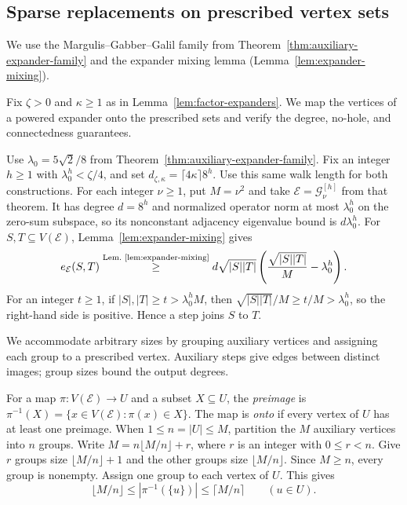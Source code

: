 \subsection{Sparse replacements on prescribed vertex sets}
\label{app:factor-expanders}

We use the Margulis--Gabber--Galil family from
Theorem~\ref{thm:auxiliary-expander-family} and the expander mixing
lemma (Lemma~\ref{lem:expander-mixing}).

Fix $\zeta>0$ and $\kappa\ge1$ as in Lemma~\ref{lem:factor-expanders}.
We map the vertices of a powered expander onto the prescribed sets
and verify the degree, no-hole, and connectedness guarantees.

Use $\lambda_0=5\sqrt2/8$ from
Theorem~\ref{thm:auxiliary-expander-family}. Fix an integer $h\ge1$
with $\lambda_0^h<\zeta/4$, and set
$d_{\zeta,\kappa}=\lceil4\kappa\rceil8^h$.
Use this same walk length for both constructions. For each integer
$\nu\ge1$, put $M=\nu^2$ and take
$\mathcal E=\mathcal G_\nu^{[h]}$ from that theorem.
It has degree $d=8^h$ and normalized operator norm at most
$\lambda_0^h$ on the zero-sum subspace, so its nonconstant
adjacency eigenvalue bound is $d\lambda_0^h$.
For $S,T\subseteq V(\mathcal E)$, Lemma~\ref{lem:expander-mixing} gives
\begin{equation}\label{eq:factor-expander-mixing}
 e_{\mathcal E}(S,T)
 \overset{\text{Lem.~\ref{lem:expander-mixing}}}{\geq}
 d\sqrt{|S||T|}\left(\frac{\sqrt{|S||T|}}{M}-\lambda_0^h\right).
\end{equation}
For an integer $t\ge1$, if $|S|,|T|\ge t>\lambda_0^hM$, then
$\sqrt{|S||T|}/M\ge t/M>\lambda_0^h$, so the right-hand side is
positive. Hence a step joins $S$ to $T$.

We accommodate arbitrary sizes by grouping auxiliary vertices and
assigning each group to a prescribed vertex. Auxiliary steps give
edges between distinct images; group sizes bound the output degrees.

For a map $\pi:V(\mathcal E)\to U$ and a subset $X\subseteq U$,
the \emph{preimage} is
$\pi^{-1}(X)=\{x\in V(\mathcal E):\pi(x)\in X\}$.
The map is \emph{onto} if every vertex of $U$ has at least one
preimage. When $1\le n=|U|\le M$, partition the $M$ auxiliary vertices
into $n$ groups. Write $M=n\lfloor M/n\rfloor+r$, where
$r$ is an integer with $0\leq r<n$. Give $r$ groups size $\lfloor M/n\rfloor+1$ and the
other groups size $\lfloor M/n\rfloor$. Since $M\geq n$, every group
is nonempty. Assign one group to each vertex of $U$. This gives
\begin{equation}\label{eq:factor-expander-preimages}
 \lfloor M/n\rfloor\le|\pi^{-1}(\{u\})|\le\lceil M/n\rceil
 \qquad(u\in U).
\end{equation}

